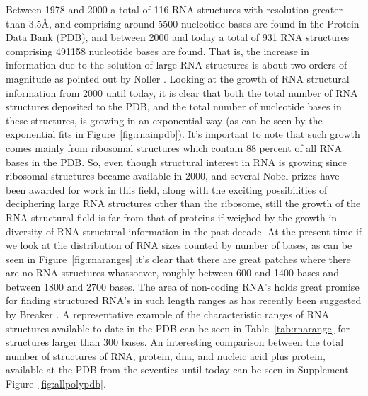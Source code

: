 \noindent Between  1978 and  2000 a total  of 116 RNA  structures with
resolution greater than 3.5\AA,  and comprising around 5500 nucleotide
bases are found  in the Protein Data Bank (PDB),  and between 2000 and
today  a  total of  931  RNA  structures comprising  491158
nucleotide bases are found.  That  is, the increase in information due
to  the  solution of  large  RNA structures  is  about  two orders  of
magnitude as pointed out  by Noller \cite{noller2005}.  Looking at the
growth  of RNA  structural information  from 2000  until today,  it is
clear that  both the total number  of RNA structures  deposited to the
PDB, and the total number  of nucleotide bases in these structures, is
growing in an exponential way (as  can be seen by the exponential fits
in  Figure~\ref{fig:rnainpdb}).   It's  important  to note  that  such
growth comes mainly from ribosomal structures which contain 88 percent
of all RNA  bases in the PDB.  So, even  though structural interest in
RNA is  growing since ribosomal  structures became available  in 2000,
and several  Nobel prizes  have been awarded  for work in  this field,
along  with  the  exciting  possibilities  of  deciphering  large  RNA
\cite{weinberg2009}  structures  other than  the  ribosome, still  the
growth of  the RNA structural  field is far  from that of  proteins if
weighed by  the growth in  diversity of RNA structural  information in
the past decade. At the present time if we look at the distribution of
RNA  sizes   counted  by   number  of  bases,   as  can  be   seen  in
Figure~\ref{fig:rnaranges}  it's clear  that there  are  great patches
where there are no RNA  structures whatsoever, roughly between 600 and
1400 bases  and between  1800 and 2700  bases. The area  of non-coding
RNA's holds great promise for  finding structured RNA's in such length
ranges    as    has     recently    been    suggested    by    Breaker
\cite{weinberg2009}.  A representative  example of  the characteristic
ranges of RNA  structures available to date in the PDB  can be seen in
Table~\ref{tab:rnarange}  for structures  larger than  300  bases.  An
interesting comparison between the  total number of structures of RNA,
protein, dna, and nucleic acid plus protein, available at the PDB from
the   seventies    until   today    can   be   seen    in   Supplement
Figure~\ref{fig:allpolypdb}.

